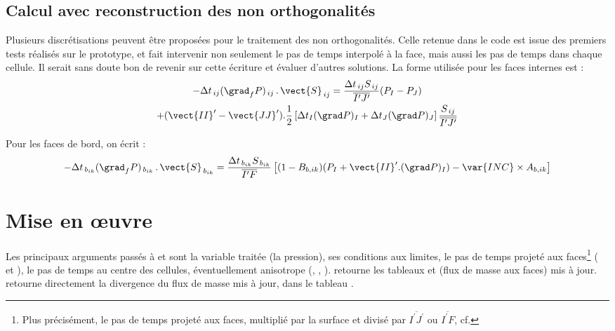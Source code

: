 \subsection*{Calcul avec reconstruction des non orthogonalit\'es}
Plusieurs discr\'etisations peuvent \^etre propos\'ees pour le traitement des
non orthogonalit\'es. Celle retenue dans le code est issue des premiers tests
r\'ealis\'es sur le prototype, et fait intervenir non seulement le pas de temps
interpol\'e \`a la face, mais aussi les pas de temps dans chaque
cellule. Il
serait sans doute bon de revenir sur cette \'ecriture et \'evaluer d'autres
solutions. La forme utilis\'ee pour les faces internes est :
\begin{multline}
\label{Base_Itrmas_eq_intavcrec}
-\Delta t_{\,ij}(\grad_f P)_{\,ij}\,.\,\vect{S}_{\,ij}=
\frac{\Delta t_{\,ij}S_{\,ij}}{\overline{I^\prime J^\prime}}(P_I-P_J)\\
+(\vect{II}^\prime-\vect{JJ}^\prime).\frac{1}{2}\left[
\Delta t_I(\grad P)_I+\Delta t_J(\grad P)_J\right]
\frac{S_{\,ij}}{\overline{I^\prime J^\prime}}
\end{multline}

Pour les faces de bord, on \'ecrit :
\begin{equation}
\label{Base_Itrmas_eq_brdavcrec}
-\Delta t_{\,b_{ik}}(\grad_f P)_{\,b_{ik}}\,.\,\vect{S}_{\,b_{ik}}=
\frac{\Delta t_{\,b_{ik}} S_{\,b_{ik}}}{\overline{I^\prime F}}
\left[(1-B_{b,ik})(P_I+\vect{II}^\prime.(\grad P)_I)-\var{INC}\times A_{b,ik}\right]
\end{equation}

\section*{Mise en \oe uvre}
Les principaux arguments pass\'es \`a  et  sont la
variable trait\'ee  (la pression), ses conditions aux limites, le pas
de temps projet\'e aux faces\footnote{%
Plus pr\'ecis\'ement, le pas de temps projet\'e aux faces, multipli\'e par la
surface et divis\'e par $\overline{I^\prime J^\prime}$ ou $\overline{I^\prime F}$, cf. }
( et ), le pas de temps au
centre des cellules, \'eventuellement anisotrope (, ,
).  retourne les tableaux  et 
(flux de masse aux faces) mis \`a jour.  retourne directement la
divergence du flux de masse mis \`a jour, dans le tableau .

